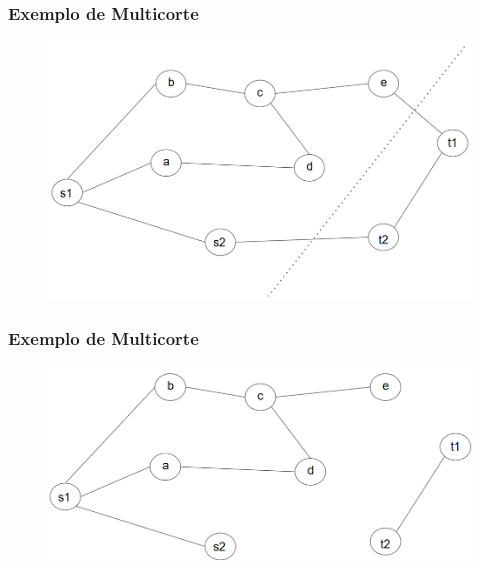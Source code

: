\documentclass[11pt, handout]{beamer}
\begin{document}
\begin{frame}
    \frametitle{Exemplo de Multicorte}
    
    \begin{figure}
        \centering
        \includegraphics[width=1\textwidth]{images/multicutEdges.png}
    \end{figure}{}
    
\end{frame}

\begin{frame}
    \frametitle{Exemplo de Multicorte}
    
    \begin{figure}
        \centering
        \includegraphics[width=1\textwidth]{images/multicutSol.png}
    \end{figure}{}
    
\end{frame}
\end{document}
